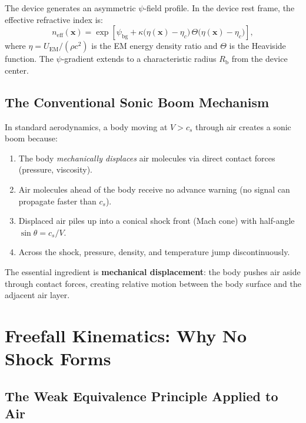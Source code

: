 \documentclass[12pt, letterpaper]{article}
\theoremstyle{definition}
\theoremstyle{remark}
\newcommand{\neff}{n_{\mathrm{eff}}}
\newcommand{\xvec}{\mathbf{x}}
\newcommand{\etac}{\eta_c}
\newcommand{\Rbub}{R_{\mathrm{b}}}
\newcommand{\cs}{c_s}
\begin{document}
The device generates an asymmetric $\psi$-field profile. In the device rest
frame, the effective refractive index is:
\begin{equation}
\neff(\xvec) = \exp\!\left[\psi_{\mathrm{bg}}
+ \kappa\bigl(\eta(\xvec) - \etac\bigr)\,\Theta\bigl(\eta(\xvec) - \etac\bigr)\right],
\label{eq:neff}
\end{equation}
where $\eta = U_{\mathrm{EM}}/(\rho c^2)$ is the EM energy density ratio and
$\Theta$ is the Heaviside function. The $\psi$-gradient extends to a
characteristic radius $\Rbub$ from the device center.

\subsection{The Conventional Sonic Boom Mechanism}

In standard aerodynamics, a body moving at $V > \cs$ through air creates a
sonic boom because:
\begin{enumerate}
\item The body \emph{mechanically displaces} air molecules via direct contact
forces (pressure, viscosity).
\item Air molecules ahead of the body receive no advance warning (no signal
can propagate faster than $\cs$).
\item Displaced air piles up into a conical shock front (Mach cone) with
half-angle $\sin\theta = \cs/V$.
\item Across the shock, pressure, density, and temperature jump discontinuously.
\end{enumerate}

The essential ingredient is \textbf{mechanical displacement}: the body pushes
air aside through contact forces, creating relative motion between the body
surface and the adjacent air layer.

\section{Freefall Kinematics: Why No Shock Forms}
\label{sec:freefall}

\subsection{The Weak Equivalence Principle Applied to Air}
\end{document}
